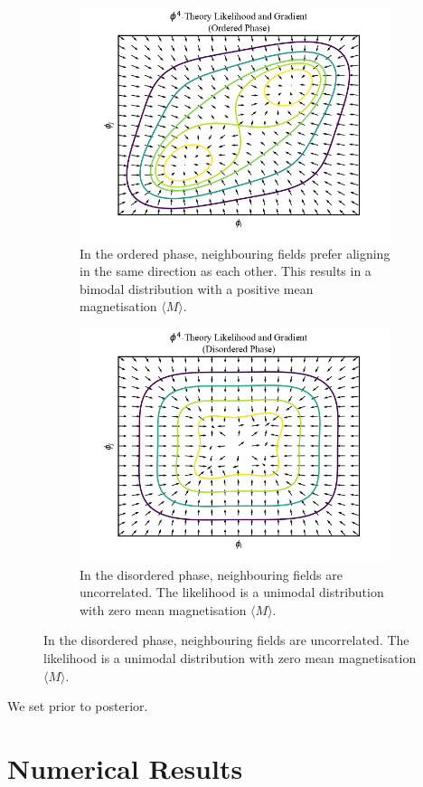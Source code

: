 \documentclass[11pt]{article}
\begin{document}
    \begin{figure}[t!]
        \centering
        \begin{subfigure}{\linewidth}
            \centering
            \includegraphics[width=\linewidth]{../figures/Phi4LikelihoodOrdered}
            \caption{
            In the ordered phase, neighbouring fields prefer aligning in the same direction as each other.
            This results in a bimodal distribution with a positive mean magnetisation $\langle M \rangle$.}
            \label{fig:phi4likelihood_ordered}
        \end{subfigure}
        \begin{subfigure}{\linewidth}
            \centering
            \includegraphics[width=\linewidth]{../figures/Phi4LikelihoodDisordered}
            \caption{
            In the disordered phase, neighbouring fields are uncorrelated. The likelihood is a unimodal distribution
            with zero mean magnetisation $\langle M \rangle$.}
            \label{fig:phi4likelihood_disordered}
        \end{subfigure}
    \end{figure}

    We set prior to posterior.

    \section{Numerical Results}\label{sec:numerical_results}
\end{document}
